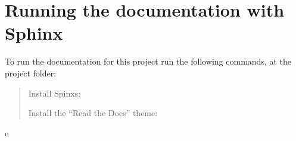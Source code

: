 \documentclass[letterpaper,10pt,english]{sphinxmanual}
\begin{document}
\section{Running the documentation with Sphinx}
\label{\detokenize{index:running-the-documentation-with-sphinx}}
To run the documentation for this project run the following commands, at the project folder:
\begin{quote}

Install Spinxs:


Install the “Read the Docs” theme:



\end{quote}


\renewcommand{\indexname}{Python Module Index}
\begin{sphinxtheindex}
\def\bigletter#1{{\Large\sffamily#1}\nopagebreak\vspace{1mm}}
\bigletter{e}
\item {}
\item {}
\end{sphinxtheindex}

\renewcommand{\indexname}{Index}
\printindex
\end{document}
